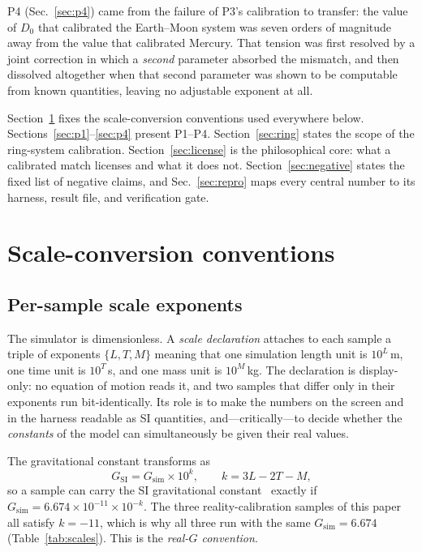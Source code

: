\documentclass[aps,reprint,amsmath,amssymb,nofootinbib,superscriptaddress,floatfix]{revtex4-2}
\begin{document}
P4 (Sec.~\ref{sec:p4}) came from the failure of P3's calibration to
transfer: the value of $D_0$ that calibrated the Earth--Moon system was
seven orders of magnitude away from the value that calibrated Mercury.
That tension was first resolved by a joint correction in which a
\emph{second} parameter absorbed the mismatch, and then dissolved
altogether when that second parameter was shown to be computable from
known quantities, leaving no adjustable exponent at all.

Section~\ref{sec:conv} fixes the scale-conversion conventions used
everywhere below.
Sections~\ref{sec:p1}--\ref{sec:p4} present P1--P4.
Section~\ref{sec:ring} states the scope of the ring-system
calibration.
Section~\ref{sec:license} is the philosophical core: what a calibrated
match licenses and what it does not.
Section~\ref{sec:negative} states the fixed list of negative claims,
and Sec.~\ref{sec:repro} maps every central number to its harness,
result file, and verification gate.

\section{Scale-conversion conventions}
\label{sec:conv}

\subsection{Per-sample scale exponents}
\label{sec:exponents}

The simulator is dimensionless.
A \emph{scale declaration} attaches to each sample a triple of
exponents $\{L,T,M\}$ meaning that one simulation length unit is
$10^{L}$\,m, one time unit is $10^{T}$\,s, and one mass unit is
$10^{M}$\,kg.
The declaration is display-only: no equation of motion reads it, and
two samples that differ only in their exponents run bit-identically.
Its role is to make the numbers on the screen and in the harness
readable as SI quantities, and---critically---to decide whether the
\emph{constants} of the model can simultaneously be given their real
values.

The gravitational constant transforms as
\begin{equation}
  G_{\mathrm{SI}} = G_{\mathrm{sim}}\times10^{k},
  \qquad k = 3L-2T-M ,
  \label{eq:Gk}
\end{equation}
so a sample can carry the SI gravitational constant~\cite{CODATA2022}
exactly if $G_{\mathrm{sim}}=6.674\times10^{-11}\times10^{-k}$.
The three reality-calibration samples of this paper all satisfy
$k=-11$, which is why all three run with the same $G_{\mathrm{sim}}=
6.674$ (Table~\ref{tab:scales}).
This is the \emph{real-$G$ convention}.
\end{document}

